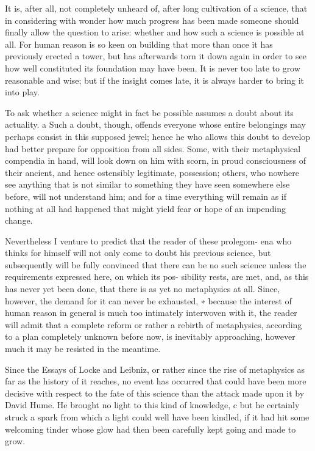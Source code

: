 It is, after all, not completely unheard of, after long cultivation of a
science, that in considering with wonder how much progress has been
made someone should ﬁnally allow the question to arise: whether and
how such a science is possible at all. For human reason is so keen on
building that more than once it has previously erected a tower, but has
afterwards torn it down again in order to see how well constituted its
foundation may have been. It is never too late to grow reasonable and
wise; but if the insight comes late, it is always harder to bring it into
play.

To ask whether a science might in fact be possible assumes a doubt
about its actuality. a Such a doubt, though, offends everyone whose entire
belongings may perhaps consist in this supposed jewel; hence he who
allows this doubt to develop had better prepare for opposition from all
sides. Some, with their metaphysical compendia in hand, will look down
on him with scorn, in proud consciousness of their ancient, and hence
ostensibly legitimate, possession; others, who nowhere see anything that
is not similar to something they have seen somewhere else before, will
not understand him; and for a time everything will remain as if nothing at
all had happened that might yield fear or hope of an impending change.

Nevertheless I venture to predict that the reader of these prolegom-
ena who thinks for himself will not only come to doubt his previous
science, but subsequently will be fully convinced that there can be no
such science unless the requirements expressed here, on which its pos-
sibility rests, are met, and, as this has never yet been done, that there is
as yet no metaphysics at all. Since, however, the demand for it can never
be exhausted, ∗ because the interest of human reason in general is much
too intimately interwoven with it, the reader will admit that a complete
reform or rather a rebirth of metaphysics, according to a plan completely
unknown before now, is inevitably approaching, however much it may
be resisted in the meantime.

Since the Essays of Locke and Leibniz, or rather since the rise of
metaphysics as far as the history of it reaches, no event has occurred that
could have been more decisive with respect to the fate of this science
than the attack made upon it by David Hume. He brought no light to
this kind of knowledge, c but he certainly struck a spark from which a
light could well have been kindled, if it had hit some welcoming tinder
whose glow had then been carefully kept going and made to grow.

